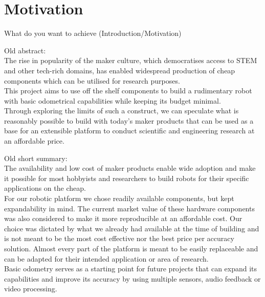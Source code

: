 \chapter{Motivation}\label{cha:motivation}

What do you want to achieve (Introduction/Motivation)

Old abstract:\\
The rise in popularity of the maker culture, which democratises access to STEM and other tech-rich domains, has enabled widespread production of cheap components which can be utilised for research purposes.\\
This project aims to use off the shelf components to build a rudimentary robot with basic odometrical capabilities while keeping its budget minimal.\\
Through exploring the limits of such a construct, we can speculate what is reasonably possible to build with today's maker products that can
be used as a base for an extensible platform to conduct scientific and engineering research at an affordable price.

Old short summary:\\
The availability and low cost of maker products enable wide adoption and make it possible for most hobbyists and
researchers to build robots for their specific applications on the cheap.\\
For our robotic platform we chose readily available components, but kept expandability in mind. The current market
value of these hardware components was also considered to make it more reproducible at an affordable cost. Our choice
was dictated by what we already had available at the time of building and is not meant to be the most cost effective
nor the best price per accuracy solution. Almost every part of the platform is meant to be easily replaceable and can
be adapted for their intended application or area of research.\\
Basic odometry serves as a starting point for future projects that can expand its capabilities and improve its accuracy
by using multiple sensors, audio feedback or video processing.

